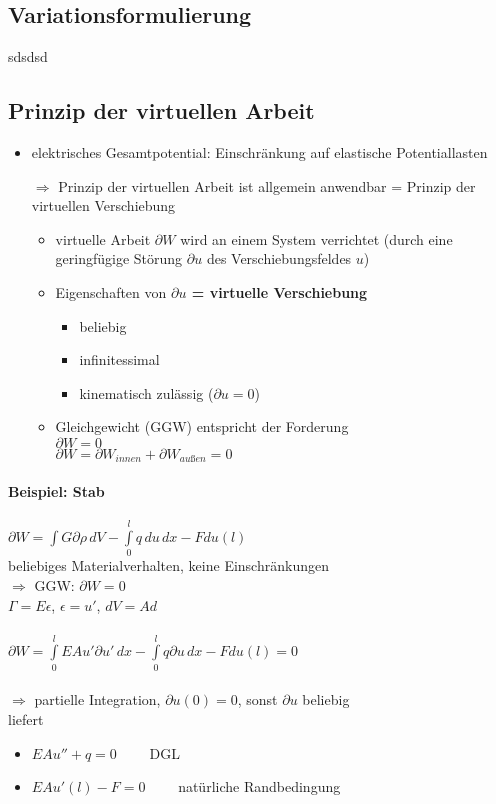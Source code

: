 \subsection{Variationsformulierung}
sdsdsd

\subsection{Prinzip der virtuellen Arbeit}
\begin{itemize}
	\item elektrisches Gesamtpotential: Einschränkung auf elastische Potentiallasten
	\item[$\Rightarrow$] Prinzip der virtuellen Arbeit ist allgemein anwendbar = Prinzip der virtuellen Verschiebung
	
	\begin{itemize}
		\item virtuelle Arbeit {\boldmath\(\partial W\)} wird an einem System verrichtet (durch eine geringfügige Störung \(\partial u\) des Verschiebungsfeldes \(u\))
		\item Eigenschaften von \textbf{\boldmath\(\partial u\) = virtuelle Verschiebung}
			\begin{itemize}
				\item beliebig
				\item infinitessimal
				\item kinematisch zulässig (\(\partial u = 0\))
			\end{itemize}
		\item Gleichgewicht (GGW) entspricht der Forderung \\
			\(\partial W = 0\)\\
			\(\partial W = \partial W_{innen} + \partial W_{außen} = 0\)
	\end{itemize}
\end{itemize}
\paragraph{Beispiel: Stab}
	\(\partial W = \int G \partial \rho\,dV - \int\limits_0^l q\,du\,dx - Fdu(l)\)\\
	beliebiges Materialverhalten, keine Einschränkungen\\
	\(\Rightarrow\) GGW: \(\partial W = 0\)\\
	\(\Gamma = E \epsilon\), \(\epsilon = u'\), \(dV = Ad\)\\\\
	{\boldmath\(\partial W = \int\limits_0^l EAu' \partial u'\, dx - \int\limits_0^l q \partial u\, dx - Fdu(l) = 0\)}\\\\
	$\Rightarrow$ partielle Integration, \(\partial u(0) = 0\), sonst \(\partial u\) beliebig\\
	liefert 
	\begin{itemize}
		\item \(E A u'' + q = 0 \qquad\) DGL
		\item \(E A u'(l) -F = 0 \qquad\) natürliche Randbedingung
	\end{itemize}
